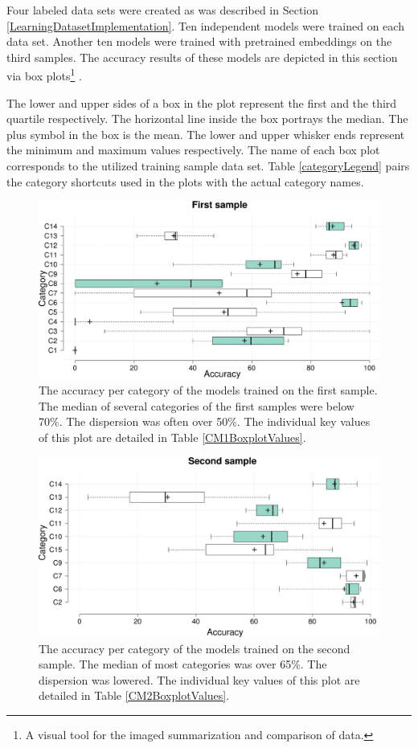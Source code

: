 Four labeled data sets were created as was described in Section \ref{LearningDatasetImplementation}. Ten independent models were trained on each data set. Another ten models were trained with pretrained embeddings on the third samples. The accuracy results of these models are depicted in this section via box plots\footnote{A visual tool for the imaged summarization and comparison of data.} \cite{boxplot}. 

The lower and upper sides of a box in the plot represent the first and the third quartile respectively. The horizontal line inside the box portrays the median. The plus symbol in the box is the mean. The lower and upper whisker ends represent the minimum and maximum values respectively. The name of each box plot corresponds to the utilized training sample data set. Table \ref{categoryLegend} pairs the category shortcuts used in the plots with the actual category names. 

 \begin{figure}[]
    \centering
    \label{CM1Boxplot}
    \includegraphics[width =\textwidth]{Images/CM1Boxplot.png}
    \caption{The accuracy per category of the models trained on the first sample. The median of several categories of the first samples were below 70\%. The dispersion was often over 50\%. The individual key values of this plot are detailed in Table \ref{CM1BoxplotValues}.}
    \label{CM1Boxplot}
\end{figure}


 \begin{figure}[]
    \centering
    \includegraphics[width =\textwidth]{Images/CM2Boxplot.png}
    \caption{The accuracy per category of the models trained on the second sample. The median of most categories was over 65\%. The dispersion was lowered. The individual key values of this plot are detailed in Table \ref{CM2BoxplotValues}.}
    \label{CM2Boxplot}
\end{figure}

